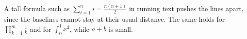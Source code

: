 \documentclass[11pt]{article}
\begin{document}
A tall formula such as $\displaystyle\sum_{i=1}^{n} i=\frac{n(n+1)}{2}$ in
running text pushes the lines apart, since the baselines cannot stay at their
usual distance. The same holds for $\displaystyle\prod_{k=1}^{m}\frac{1}{k}$
and for $\displaystyle\int_0^1 x^2$, while $\scriptstyle a+b$ is small.
\end{document}
